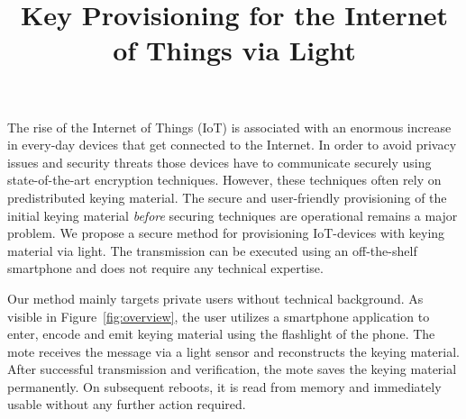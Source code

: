 \documentclass{sig-alternate} %
\begin{document}
\normalsize

\title{Key Provisioning for the Internet of Things via Light}


\toappear{}
\maketitle

The rise of the Internet of Things (IoT) is associated with an enormous increase in every-day devices that get connected to the Internet.
In order to avoid privacy issues and security threats those devices have to communicate securely using state-of-the-art encryption techniques.
However, these techniques often rely on predistributed keying material.
The secure and user-friendly provisioning of the initial keying material \textit{before} securing techniques are operational remains a major problem.
We propose a secure method for provisioning IoT-devices with keying material via light.
The transmission can be executed using an off-the-shelf smartphone and does not require any technical expertise.


Our method mainly targets private users without technical background.
As visible in Figure~\ref{fig:overview}, the user utilizes a smartphone application to enter, encode and emit keying material using the flashlight of the phone.
The mote receives the message via a light sensor and reconstructs the keying material.
After successful transmission and verification, the mote saves the keying material permanently.
On subsequent reboots, it is read from memory and immediately usable without any further action required.
\end{document}
